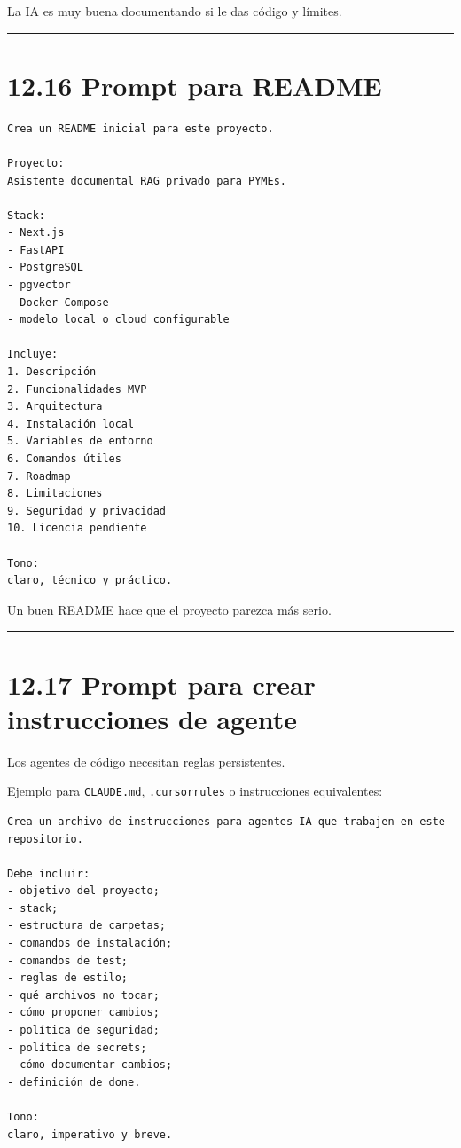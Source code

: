 La IA es muy buena documentando si le das código y límites.

\begin{center}\rule{0.5\linewidth}{0.5pt}\end{center}

\section{12.16 Prompt para README}\label{prompt-para-readme}

\begin{lstlisting}
Crea un README inicial para este proyecto.

Proyecto:
Asistente documental RAG privado para PYMEs.

Stack:
- Next.js
- FastAPI
- PostgreSQL
- pgvector
- Docker Compose
- modelo local o cloud configurable

Incluye:
1. Descripción
2. Funcionalidades MVP
3. Arquitectura
4. Instalación local
5. Variables de entorno
6. Comandos útiles
7. Roadmap
8. Limitaciones
9. Seguridad y privacidad
10. Licencia pendiente

Tono:
claro, técnico y práctico.
\end{lstlisting}

Un buen README hace que el proyecto parezca más serio.

\begin{center}\rule{0.5\linewidth}{0.5pt}\end{center}

\section{12.17 Prompt para crear instrucciones de
agente}\label{prompt-para-crear-instrucciones-de-agente}

Los agentes de código necesitan reglas persistentes.

Ejemplo para \passthrough{\lstinline!CLAUDE.md!},
\passthrough{\lstinline!.cursorrules!} o instrucciones equivalentes:

\begin{lstlisting}
Crea un archivo de instrucciones para agentes IA que trabajen en este repositorio.

Debe incluir:
- objetivo del proyecto;
- stack;
- estructura de carpetas;
- comandos de instalación;
- comandos de test;
- reglas de estilo;
- qué archivos no tocar;
- cómo proponer cambios;
- política de seguridad;
- política de secrets;
- cómo documentar cambios;
- definición de done.

Tono:
claro, imperativo y breve.
\end{lstlisting}


